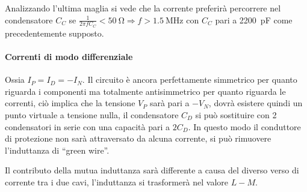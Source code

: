 Analizzando l'ultima maglia si vede che la corrente preferirà percorrere nel 
condensatore $C_C$ se $\frac{1}{2 \pi f C_C} < \SI{50}{\ohm} 
\Rightarrow f > \SI{1.5}{\mega\hertz}$ con $C_C$ pari a \SI{2200}{\pico\farad} come 
precedentemente supposto.

\paragraph{Correnti di modo differenziale} Ossia $I_P = I_D = - I_N$.
Il circuito è ancora perfettamente simmetrico per quanto riguarda i componenti
ma totalmente antisimmetrico per quanto riguarda le correnti, ciò implica che 
la tensione $V_P$ sarà pari a $-V_N$, dovrà esistere quindi un punto virtuale a tensione
nulla, il condensatore $C_D$ si può sostituire con 2 condensatori in serie
con una capacità pari a $2C_D$.
In questo modo il conduttore di protezione non sarà attraversato da alcuna corrente, si 
può rimuovere l'induttanza di ``green wire''.

Il contributo della mutua induttanza sarà differente a causa del diverso verso di corrente
tra i due cavi, l'induttanza si trasformerà nel valore $L-M$.
